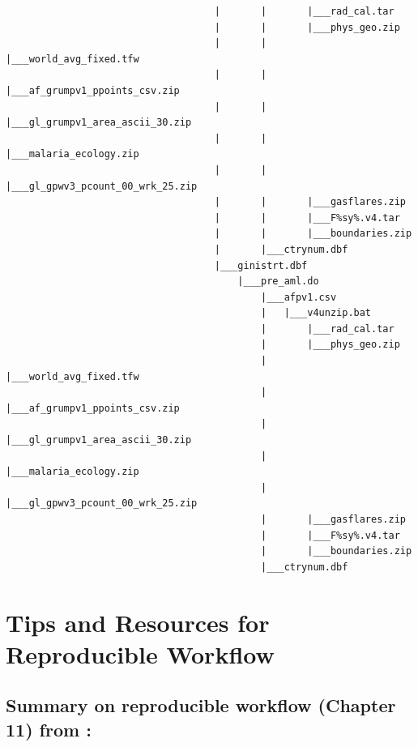 \documentclass[]{book}
\begin{document}
\begin{verbatim}
                                    |       |       |___rad_cal.tar
                                    |       |       |___phys_geo.zip
                                    |       |       |___world_avg_fixed.tfw
                                    |       |       |___af_grumpv1_ppoints_csv.zip
                                    |       |       |___gl_grumpv1_area_ascii_30.zip
                                    |       |       |___malaria_ecology.zip
                                    |       |       |___gl_gpwv3_pcount_00_wrk_25.zip
                                    |       |       |___gasflares.zip
                                    |       |       |___F%sy%.v4.tar
                                    |       |       |___boundaries.zip
                                    |       |___ctrynum.dbf
                                    |___ginistrt.dbf
                                        |___pre_aml.do
                                            |___afpv1.csv
                                            |   |___v4unzip.bat
                                            |       |___rad_cal.tar
                                            |       |___phys_geo.zip
                                            |       |___world_avg_fixed.tfw
                                            |       |___af_grumpv1_ppoints_csv.zip
                                            |       |___gl_grumpv1_area_ascii_30.zip
                                            |       |___malaria_ecology.zip
                                            |       |___gl_gpwv3_pcount_00_wrk_25.zip
                                            |       |___gasflares.zip
                                            |       |___F%sy%.v4.tar
                                            |       |___boundaries.zip
                                            |___ctrynum.dbf
\end{verbatim}

\hypertarget{tips-and-resources-for-reproducible-workflow}{%
\chapter{Tips and Resources for Reproducible Workflow}\label{tips-and-resources-for-reproducible-workflow}}

\hypertarget{summary-on-reproducible-workflow-chapter-11-from-christensen2019transparent}{%
\section{\texorpdfstring{Summary on reproducible workflow (Chapter 11) from \citet{christensen2019transparent}:}{Summary on reproducible workflow (Chapter 11) from @christensen2019transparent:}}\label{summary-on-reproducible-workflow-chapter-11-from-christensen2019transparent}}
\end{document}
